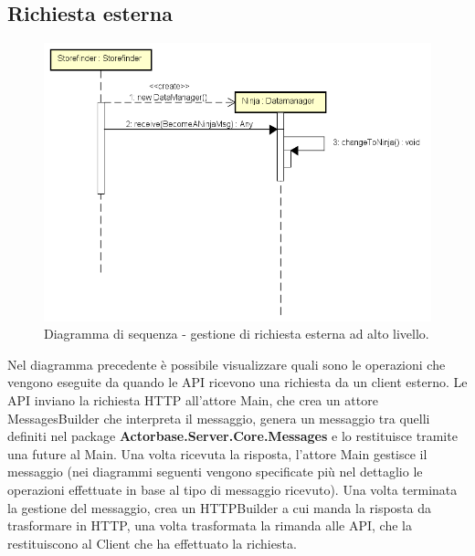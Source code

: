 \documentclass[a4paper]{article}
\begin{document}
        \subsection{Richiesta esterna}
            \begin{figure} [H]
				\centering
				\includegraphics[width=\textwidth]{ST/seq/CreazioneNinja.png}
				\caption{Diagramma di sequenza - gestione di richiesta esterna ad alto livello.}
			\end{figure}
            Nel diagramma precedente è possibile visualizzare quali sono le operazioni che vengono eseguite da quando le API ricevono una richiesta da un client 
            esterno. Le API inviano la richiesta HTTP all'attore Main, che crea un attore MessagesBuilder che interpreta il messaggio, genera un messaggio tra quelli 
            definiti nel package \textbf{Actorbase.Server.Core.Messages} e lo restituisce tramite una future al Main. Una volta ricevuta la risposta, l'attore Main 
            gestisce il messaggio (nei diagrammi seguenti vengono specificate più nel dettaglio le operazioni effettuate in base al tipo di messaggio ricevuto). 
            Una volta terminata la gestione del messaggio, crea un HTTPBuilder a cui manda la risposta da trasformare in HTTP, una volta trasformata la rimanda 
            alle API, che la restituiscono al Client che ha effettuato la richiesta.
            
\end{document}
